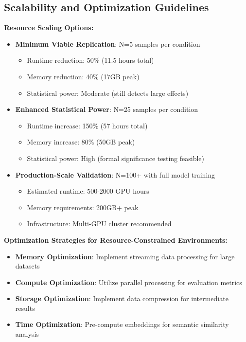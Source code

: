 \documentclass{article}
\begin{document}
\subsection{Scalability and Optimization Guidelines}

\textbf{Resource Scaling Options:}
\begin{itemize}
    \item \textbf{Minimum Viable Replication}: N=5 samples per condition
    \begin{itemize}
        \item Runtime reduction: 50\% (11.5 hours total)
        \item Memory reduction: 40\% (17GB peak)
        \item Statistical power: Moderate (still detects large effects)
    \end{itemize}
    \item \textbf{Enhanced Statistical Power}: N=25 samples per condition
    \begin{itemize}
        \item Runtime increase: 150\% (57 hours total)
        \item Memory increase: 80\% (50GB peak)
        \item Statistical power: High (formal significance testing feasible)
    \end{itemize}
    \item \textbf{Production-Scale Validation}: N=100+ with full model training
    \begin{itemize}
        \item Estimated runtime: 500-2000 GPU hours
        \item Memory requirements: 200GB+ peak
        \item Infrastructure: Multi-GPU cluster recommended
    \end{itemize}
\end{itemize}

\textbf{Optimization Strategies for Resource-Constrained Environments:}
\begin{itemize}
    \item \textbf{Memory Optimization}: Implement streaming data processing for large datasets
    \item \textbf{Compute Optimization}: Utilize parallel processing for evaluation metrics
    \item \textbf{Storage Optimization}: Implement data compression for intermediate results
    \item \textbf{Time Optimization}: Pre-compute embeddings for semantic similarity analysis
\end{itemize}
\end{document}
